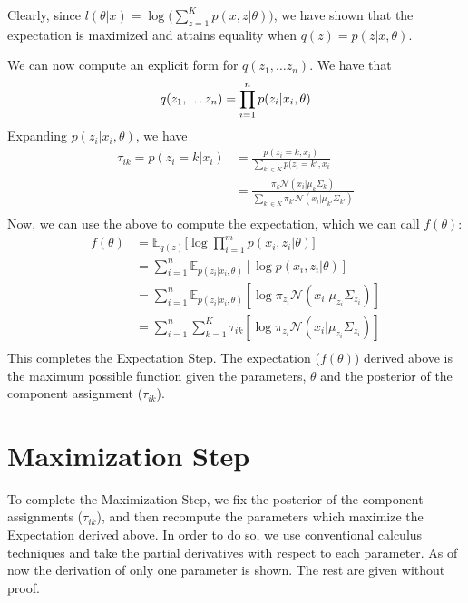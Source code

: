 \documentclass{article}
\begin{document}
Clearly, since $l(\theta | x) = \log \Big(\sum\limits_{z = 1}^{K} p(x, z | \theta) \Big)$, we have shown that the expectation is maximized and attains equality when $q(z) = p(z | x, \theta)$.

We can now compute an explicit form for $q(z_{1}, \ldots z_{n})$. We have that
\begin{equation}
	q(z_{1}, \ldots z_{n}) = \prod\limits_{i = 1}^{n} p(z_{i} | x_{i}, \theta) \\
\end{equation}
Expanding $p(z_{i} | x_{i}, \theta)$, we have
\begin{align*}
	\tau_{ik} = p(z_{i} = k | x_{i})
		&= \frac{p(z_{i} = k, x_{i})}{\sum\limits_{k' \in K} p(z_{i} = k', x_{i}} \\
		&= \frac{\pi_{k} \mathcal{N}(x_{i} | \mu_{k} \Sigma_{k})}{\sum\limits_{k' \in K} \pi_{k'} \mathcal{N}(x_{i} | \mu_{k'} \Sigma_{k'})} \\
\end{align*}
Now, we can use the above to compute the expectation, which we can call $f(\theta)$:
\begin{align*}
	f(\theta)
		&= \mathbb{E}_{q(z)} \Bigg[ \log \prod\limits_{i = 1}^{m} p(x_{i}, z_{i} | \theta) \Bigg] \\
		&= \sum\limits_{i = 1}^{n} \mathbb{E}_{p(z_{i} | x_{i}, \theta)} [\log p(x_{i}, z_{i} | \theta)] \\
		&= \sum\limits_{i = 1}^{n} \mathbb{E}_{p(z_{i} | x_{i}, \theta)} [\log \pi_{z_{i}} \mathcal{N}(x_{i} | \mu_{z_{i}} \Sigma_{z_{i}})] \\
		&= \sum\limits_{i = 1}^{n} \sum\limits_{k = 1}^{K} \tau_{ik} [\log \pi_{z_{i}} \mathcal{N}(x_{i} | \mu_{z_{i}} \Sigma_{z_{i}})] \\
\end{align*}
This completes the Expectation Step. The expectation ($f(\theta)$) derived above is the maximum possible function given the parameters, $\theta$ and the posterior of the component assignment ($\tau_{ik}$).

\section{Maximization Step}
To complete the Maximization Step, we fix the posterior of the component assignments ($\tau_{ik}$), and then recompute the parameters which maximize the Expectation derived above. In order to do so, we use conventional calculus techniques and take the partial derivatives with respect to each parameter. As of now the derivation of only one parameter is shown. The rest are given without proof.
\end{document}
